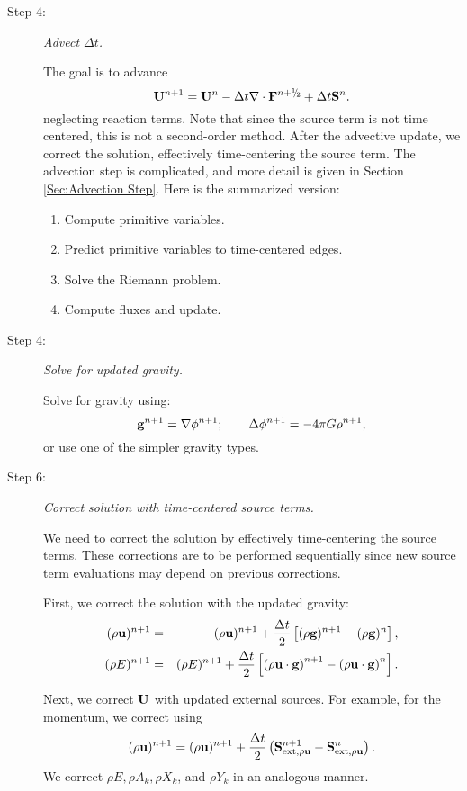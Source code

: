 \begin{description}
\item[Step 4:] {\em Advect $\Delta t$.}

The goal is to advance
\begin{equation}
\Ub^{n+1} = \Ub^n - \dt\nabla\cdot\Fb^\nph + \dt\Sb^n.
\end{equation}
neglecting reaction terms.  Note that since the source term is not
time centered, this is not a second-order method.  After the advective
update, we correct the solution, effectively time-centering the source
term. The advection step is complicated, and more detail is given in
Section \ref{Sec:Advection Step}.  Here is the summarized version:
\begin{enumerate}
\item Compute primitive variables.
\item Predict primitive variables to time-centered edges.
\item Solve the Riemann problem.
\item Compute fluxes and update.
\end{enumerate}
\item[Step 4:] {\em Solve for updated gravity.}

Solve for gravity using:
\begin{equation}
{\bf g}^{n+1} = \nabla\phi^{n+1}; \qquad \Delta\phi^{n+1} = -4\pi G\rho^{n+1},
\end{equation}
or use one of the simpler gravity types.
\item[Step 6:] {\em Correct solution with time-centered source terms.}

We need to correct the solution by effectively time-centering the
source terms.  These corrections are to be performed sequentially
since new source term evaluations may depend on previous corrections.

First, we correct the solution with the updated gravity:
\begin{eqnarray}
(\rho{\bf u})^{n+1} &=& (\rho{\bf u})^{n+1} + \frac{\Delta t}{2}\left[(\rho{\bf g})^{n+1} - (\rho{\bf g})^n\right], \\
(\rho E)^{n+1} &=& (\rho E)^{n+1} + \frac{\Delta t}{2}\left[\left(\rho{\bf u}\cdot{\bf g}\right)^{n+1} - \left(\rho{\bf u}\cdot{\bf g}\right)^n\right].
\end{eqnarray}

Next, we correct ${\bf U}$ with updated external sources.  For example,
for the momentum, we correct using
\begin{equation}
(\rho{\bf u})^{n+1} = (\rho{\bf u})^{n+1} + \frac{\Delta t}{2}\left({\bf S}_{{\rm ext},\rho{\bf u}}^{n+1} - {\bf S}_{{\rm ext},\rho{\bf u}}^n\right).
\end{equation}
We correct $\rho E, \rho A_k, \rho X_k$, and $\rho Y_k$ in an
analogous manner.


\end{description}
